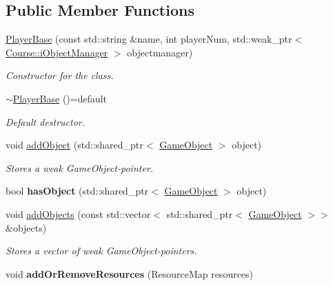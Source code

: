 \subsection*{Public Member Functions}
\begin{DoxyCompactItemize}
\item 
\hyperlink{class_course_1_1_player_base_a6578e302990fbc747bc5e9b96f8296bc}{Player\-Base} (const std\-::string \&name, int player\-Num, std\-::weak\-\_\-ptr$<$ \hyperlink{class_course_1_1i_object_manager}{Course\-::i\-Object\-Manager} $>$ objectmanager)
\begin{DoxyCompactList}\small\item\em Constructor for the class. \end{DoxyCompactList}\item 
\hypertarget{class_course_1_1_player_base_a056975b9b5c151e86ca1ca1a0501f87c}{\hyperlink{class_course_1_1_player_base_a056975b9b5c151e86ca1ca1a0501f87c}{$\sim$\-Player\-Base} ()=default}\label{class_course_1_1_player_base_a056975b9b5c151e86ca1ca1a0501f87c}

\begin{DoxyCompactList}\small\item\em Default destructor. \end{DoxyCompactList}\item 
void \hyperlink{class_course_1_1_player_base_a45eef8e289dc7e925cbd3cb90e9374ae}{add\-Object} (std\-::shared\-\_\-ptr$<$ \hyperlink{class_course_1_1_game_object}{Game\-Object} $>$ object)
\begin{DoxyCompactList}\small\item\em Stores a weak Game\-Object-\/pointer. \end{DoxyCompactList}\item 
\hypertarget{class_course_1_1_player_base_ac850222857d804443a1e9a9c39fa18bf}{bool {\bfseries has\-Object} (std\-::shared\-\_\-ptr$<$ \hyperlink{class_course_1_1_game_object}{Game\-Object} $>$ object)}\label{class_course_1_1_player_base_ac850222857d804443a1e9a9c39fa18bf}

\item 
void \hyperlink{class_course_1_1_player_base_a282f4042ea93bf7c241b8f11f4da7916}{add\-Objects} (const std\-::vector$<$ std\-::shared\-\_\-ptr$<$ \hyperlink{class_course_1_1_game_object}{Game\-Object} $>$$>$ \&objects)
\begin{DoxyCompactList}\small\item\em Stores a vector of weak Game\-Object-\/pointers. \end{DoxyCompactList}\item 
\hypertarget{class_course_1_1_player_base_aabf0acaaa686428a30c49bf51c949ee6}{void {\bfseries add\-Or\-Remove\-Resources} (Resource\-Map resources)}\label{class_course_1_1_player_base_aabf0acaaa686428a30c49bf51c949ee6}


\end{DoxyCompactItemize}
